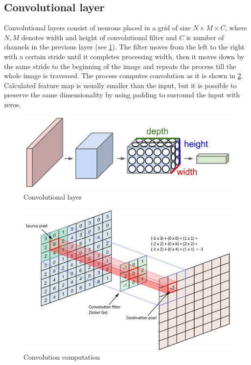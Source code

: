 \documentclass[twoside]{ctuthesis}
\theoremstyle{plain}
\theoremstyle{definition}
\theoremstyle{note}
\begin{document}
\subsection{Convolutional layer} 

Convolutional layers consist of neurons placed in a grid of size $N \times M \times C$, where $N, M$ denotes width and height of convolutional filter and $C$ is number of channels in the previous layer (see \ref{convolutional_layer}). The filter moves from the left to the right with a certain stride until it completes processing width, then it moves down by the same stride to the beginning of the image    and repeats the process till the whole image is traversed. The process computes convolution as it is shown in \ref{conv_comp}. Calculated feature map is usually smaller than the input, but it is possible to preserve the same dimensionality by using padding to surround the input with zeros. 

\begin{figure}[h]
\caption{Convolutional layer\cite{cs231n}}
\label{convolutional_layer}
\includegraphics[width=\textwidth]{images/neural_networks/cnn.jpeg}
\end{figure}



\begin{figure}[h]
\caption{Convolution computation\cite{cs231n}}
\label{conv_comp}
\includegraphics[width=\textwidth]{images/neural_networks/conv.png}
\end{figure}
\end{document}
